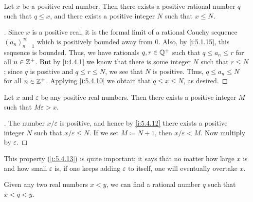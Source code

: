 \begin{prop}\label{i:5.4.12}
  Let \(x\) be a positive real number.
  Then there exists a positive rational number \(q\) such that \(q \leq x\), and there exists a positive integer \(N\) such that \(x \leq N\).
\end{prop}

\begin{proof}[]
  Since \(x\) is a positive real, it is the formal limit of a rational Cauchy sequence \((a_n)_{n = 1}^{\infty}\) which is positively bounded away from \(0\).
  Also, by \cref{i:5.1.15}, this sequence is bounded.
  Thus, we have rationals \(q, r \in \mathbb{Q}^+\) such that \(q \leq a_n \leq r\) for all \(n \in \mathbb{Z}^+\).
  But by \cref{i:4.4.1} we know that there is some integer \(N\) such that \(r \leq N\);
  since \(q\) is positive and \(q \leq r \leq N\), we see that \(N\) is positive.
  Thus, \(q \leq a_n \leq N\) for all \(n \in \mathbb{Z}^+\).
  Applying \cref{i:5.4.10} we obtain that \(q \leq x \leq N\), as desired.
\end{proof}

\begin{cor}\label{i:5.4.13}
  Let \(x\) and \(\varepsilon\) be any positive real numbers.
  Then there exists a positive integer \(M\) such that \(M\varepsilon > x\).
\end{cor}

\begin{proof}[]
  The number \(x / \varepsilon\) is positive, and hence by \cref{i:5.4.12} there exists a positive integer \(N\) such that \(x / \varepsilon \leq N\).
  If we set \(M \coloneqq N + 1\), then \(x / \varepsilon < M\).
  Now multiply by \(\varepsilon\).
\end{proof}

\begin{note}
  This property (\cref{i:5.4.13}) is quite important;
  it says that no matter how large \(x\) is and how small \(\varepsilon\) is, if one keeps adding \(\varepsilon\) to itself, one will eventually overtake \(x\).
\end{note}

\begin{prop}\label{i:5.4.14}
  Given any two real numbers \(x < y\), we can find a rational number \(q\) such that \(x < q < y\).
\end{prop}

